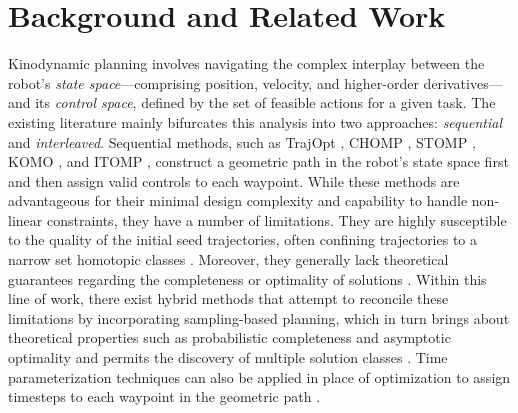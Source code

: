 \section{Background and Related Work}\label{sec:background}

Kinodynamic planning involves navigating the complex interplay between the robot's \textsl{state space}---comprising position, velocity, and higher-order derivatives---and its \textsl{control space}, defined by the set of feasible actions for a given task.
The existing literature mainly bifurcates this analysis into two approaches: \textsl{sequential} and \textsl{interleaved}. 
Sequential methods, such as TrajOpt \cite{schulman2013finding}, CHOMP \cite{ratliff2009chomp}, STOMP \cite{kalakrishnan2011stomp}, KOMO \cite{toussaint2014newton}, and ITOMP \cite{park2012itomp}, 
construct a geometric path in the robot's state space first and then assign valid controls to each waypoint. %
While these methods are advantageous for their minimal design complexity and capability to handle non-linear constraints, they have a number of limitations.
They are highly susceptible to the quality of the initial seed trajectories, often confining trajectories to a narrow set homotopic classes \cite{schulman2013finding,ichnowski2020deep}.
Moreover, they generally lack theoretical guarantees regarding the completeness or optimality of solutions \cite{kuntz2019fast}.
Within this line of work, there exist hybrid methods that attempt to reconcile these limitations by incorporating sampling-based planning, which in turn brings about theoretical properties such as probabilistic completeness and asymptotic optimality \cite{kuntz2019fast} and permits the discovery of multiple solution classes \cite{kamat2022bitkomo}.
Time parameterization techniques can also be applied in place of optimization to assign timesteps to each waypoint in the geometric path \cite{pham2014general,Berscheid-RSS-21,macfarlane}.



